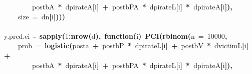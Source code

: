 \documentclass{article}
\makeatletter
\newcommand{\hlnumber}[1]{\textcolor[rgb]{0,0,0}{#1}}%
\newcommand{\hlfunctioncall}[1]{\textcolor[rgb]{.5,0,.33}{\textbf{#1}}}%
\newcommand{\hlkeyword}[1]{\textbf{#1}}%
\newcommand{\hlargument}[1]{\textcolor[rgb]{.69,.25,.02}{#1}}%
\newcommand{\hlformalargs}[1]{\hlargument{#1}}%
\newcommand{\hlassignement}[1]{\textbf{#1}}%
\newcommand{\hlsymbol}[1]{#1}%
\newcommand{\hlstd}[1]{\textcolor[rgb]{0,0,0}{#1}}%
\newenvironment{kframe}{%
 \def\FrameCommand##1{\hskip\@totalleftmargin \hskip-\fboxsep
 \colorbox{shadecolor}{##1}\hskip-\fboxsep
     \hskip-\linewidth \hskip-\@totalleftmargin \hskip\columnwidth}%
 \MakeFramed {\advance\hsize-\width
   \@totalleftmargin\z@ \linewidth\hsize
   \@setminipage}}%
 {\par\unskip\endMakeFramed}
\newenvironment{knitrout}{}{} %
\makeatother
\begin{document}
\begin{knitrout}
{\begin{kframe}
\begin{flushleft}
\hlstd{}{\ }{\ }{\ }{\ }{\ }{\ }{\ }{\ }\hlsymbol{post}\hlkeyword{\usebox{\hlnormalsizeboxdollar}}\hlsymbol{bA}{\ }\hlkeyword{*}{\ }\hlsymbol{d}\hlkeyword{\usebox{\hlnormalsizeboxdollar}}\hlsymbol{pirateA}\hlkeyword{[}\hlsymbol{i}\hlkeyword{]}{\ }\hlkeyword{+}{\ }\hlsymbol{post}\hlkeyword{\usebox{\hlnormalsizeboxdollar}}\hlsymbol{bPA}{\ }\hlkeyword{*}{\ }\hlsymbol{d}\hlkeyword{\usebox{\hlnormalsizeboxdollar}}\hlsymbol{pirateL}\hlkeyword{[}\hlsymbol{i}\hlkeyword{]}{\ }\hlkeyword{*}{\ }\hlsymbol{d}\hlkeyword{\usebox{\hlnormalsizeboxdollar}}\hlsymbol{pirateA}\hlkeyword{[}\hlsymbol{i}\hlkeyword{]}\hlkeyword{)}\hlkeyword{,}\hspace*{\fill}\\
\hlstd{}{\ }{\ }{\ }{\ }\hlargument{size}{\ }\hlargument{=}{\ }\hlsymbol{d}\hlkeyword{\usebox{\hlnormalsizeboxdollar}}\hlsymbol{n}\hlkeyword{[}\hlsymbol{i}\hlkeyword{]}\hlkeyword{)}\hlkeyword{)}\hlkeyword{)}\hspace*{\fill}\\
\hlstd{}\hspace*{\fill}\\
\hlstd{}\hlsymbol{y.pred.ci}{\ }\hlassignement{\usebox{\hlnormalsizeboxlessthan}-}{\ }\hlfunctioncall{sapply}\hlkeyword{(}\hlnumber{1}\hlkeyword{:}\hlfunctioncall{nrow}\hlkeyword{(}\hlsymbol{d}\hlkeyword{)}\hlkeyword{,}{\ }\hlkeyword{function}\hlkeyword{(}\hlformalargs{i}\hlkeyword{)}{\ }\hlfunctioncall{PCI}\hlkeyword{(}\hlfunctioncall{rbinom}\hlkeyword{(}\hlargument{n}{\ }\hlargument{=}{\ }\hlnumber{10000}\hlkeyword{,}\hspace*{\fill}\\
\hlstd{}{\ }{\ }{\ }{\ }\hlargument{prob}{\ }\hlargument{=}{\ }\hlfunctioncall{logistic}\hlkeyword{(}\hlsymbol{post}\hlkeyword{\usebox{\hlnormalsizeboxdollar}}\hlsymbol{a}{\ }\hlkeyword{+}{\ }\hlsymbol{post}\hlkeyword{\usebox{\hlnormalsizeboxdollar}}\hlsymbol{bP}{\ }\hlkeyword{*}{\ }\hlsymbol{d}\hlkeyword{\usebox{\hlnormalsizeboxdollar}}\hlsymbol{pirateL}\hlkeyword{[}\hlsymbol{i}\hlkeyword{]}{\ }\hlkeyword{+}{\ }\hlsymbol{post}\hlkeyword{\usebox{\hlnormalsizeboxdollar}}\hlsymbol{bV}{\ }\hlkeyword{*}{\ }\hlsymbol{d}\hlkeyword{\usebox{\hlnormalsizeboxdollar}}\hlsymbol{victimL}\hlkeyword{[}\hlsymbol{i}\hlkeyword{]}{\ }\hlkeyword{+}\hspace*{\fill}\\
\hlstd{}{\ }{\ }{\ }{\ }{\ }{\ }{\ }{\ }\hlsymbol{post}\hlkeyword{\usebox{\hlnormalsizeboxdollar}}\hlsymbol{bA}{\ }\hlkeyword{*}{\ }\hlsymbol{d}\hlkeyword{\usebox{\hlnormalsizeboxdollar}}\hlsymbol{pirateA}\hlkeyword{[}\hlsymbol{i}\hlkeyword{]}{\ }\hlkeyword{+}{\ }\hlsymbol{post}\hlkeyword{\usebox{\hlnormalsizeboxdollar}}\hlsymbol{bPA}{\ }\hlkeyword{*}{\ }\hlsymbol{d}\hlkeyword{\usebox{\hlnormalsizeboxdollar}}\hlsymbol{pirateL}\hlkeyword{[}\hlsymbol{i}\hlkeyword{]}{\ }\hlkeyword{*}{\ }\hlsymbol{d}\hlkeyword{\usebox{\hlnormalsizeboxdollar}}\hlsymbol{pirateA}\hlkeyword{[}\hlsymbol{i}\hlkeyword{]}\hlkeyword{)}\hlkeyword{,}\hspace*{\fill}\\

\end{flushleft}
\end{kframe}}
\end{knitrout}
\end{document}
